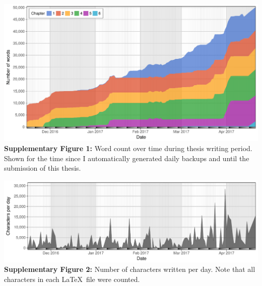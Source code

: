 \documentclass[a4paper,twoside]{dphilthesis}
\begin{document}
\vspace*{2ex}

\begin{flushleft}
\includegraphics[width=\textwidth]{./img/stat_wordcount}
\vspace*{-5ex}
\small\singlespacing\textbf{Supplementary Figure 1:} Word count over time during thesis writing period. Shown for the time since I automatically generated daily backups and until the submission of this thesis.
\end{flushleft}

\vspace*{2ex}

\begin{flushleft}
\includegraphics[width=\textwidth]{./img/stat_charrate}
\vspace*{-5ex}
\small\singlespacing\textbf{Supplementary Figure 2:} Number of characters written per day. Note that all characters in each \LaTeX~file were counted.
\end{flushleft}

\vspace*{2ex}
\end{document}
